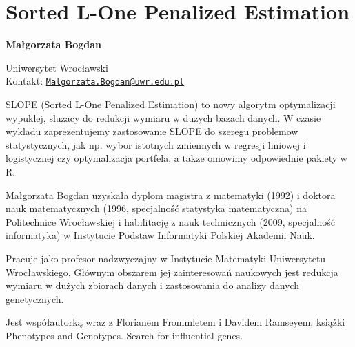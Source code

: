 \documentclass[\main/boa.tex]{subfiles}
\begin{document}
\section{Sorted L-One Penalized Estimation}


\begin{minipage}{0.915\textwidth}
	\centering
  {\bf \LARGE {} Małgorzata Bogdan}
\end{minipage}




\begin{affiliations}
\begin{minipage}{0.915\textwidth}
\centering
\large Uniwersytet Wrocławski  \\[1pt]
Kontakt: \href{mailto:Malgorzata.Bogdan@uwr.edu.pl}{\nolinkurl{Malgorzata.Bogdan@uwr.edu.pl}}\\
\end{minipage}
\end{affiliations}


SLOPE (Sorted L-One Penalized Estimation) to nowy algorytm optymalizacji wypuklej, sluzacy do redukcji wymiaru w duzych bazach danych. W czasie wykladu zaprezentujemy zastosowanie SLOPE do szeregu problemow statystycznych, jak np. wybor istotnych zmiennych w regresji liniowej i logistycznej czy optymalizacja portfela, a takze omowimy odpowiednie pakiety w R. 

\bio
Małgorzata Bogdan uzyskała dyplom magistra z matematyki (1992) i doktora nauk matematycznych (1996, specjalność statystyka matematyczna) na Politechnice Wrocławskiej i habilitację z nauk technicznych (2009, specjalność informatyka) w Instytucie Podstaw Informatyki Polskiej Akademii Nauk.

Pracuje jako profesor nadzwyczajny w Instytucie Matematyki Uniwersytetu Wrocławskiego. Głównym obszarem jej zainteresowań naukowych jest redukcja wymiaru w dużych zbiorach danych i zastosowania do analizy danych genetycznych.

Jest współautorką wraz z Florianem Frommletem i Davidem Ramseyem, książki Phenotypes and Genotypes. Search for influential genes.
\end{document}
